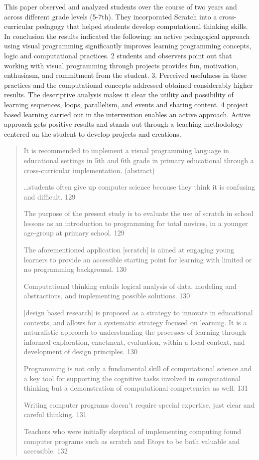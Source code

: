 \documentclass[12pt]{extarticle}
\begin{document}
This paper observed and analyzed students over the course of two years and across different grade levels (5-7th). They incorporated Scratch into a cross-curricular pedagogy that helped students develop computational thinking skills. In conclusion the results indicated the following: an active pedagogical approach using visual programming significantly improves learning programming concepts, logic and computational practices. 2 students and observers point out that working with visual programming through projects provides fun, motivation, enthusiasm, and commitment from the student. 3. Perceived usefulness in these practices and the computational concepts addressed obtained considerably higher results. The descriptive analysis makes it clear the utility and possibility of learning sequences, loops, parallelism, and events and sharing content. 4 project based learning carried out in the intervention enables an active approach. Active approach gets positive results and stands out through a teaching methodology centered on the student to develop projects and creations.
\begin{quotation}
    
    It is recommended to implement a visual programming language in educational settings in 5th and 6th grade in primary educational through a cross-curricular implementation. (abstract)
    
    …students often give up computer science because they think it is confusing and difficult. 	129
    
    The purpose of the present study is to evaluate the use of scratch in school lessons as an introduction to programming for total novices, in a younger age-group at primary school. 129
    
    The aforementioned application [scratch] is aimed at engaging young learners to provide an accessible starting point for learning with limited or no programming background. 	130
    
    Computational thinking entails logical analysis of data, modeling and abstractions, and implementing possible solutions. 	130
    
    [design based research] is proposed as a strategy to innovate in educational contexts, and allows for a systematic strategy focused on learning. It is a naturalistic approach to understanding the processes of learning through informed exploration, enactment, evaluation, within a local context, and development of design principles. 130
    
    Programming is not only a fundamental skill of computational science and a key tool for supporting the cognitive tasks involved in computational thinking but a demonstration of computational competencies as well.  131
    
    Writing computer programs doesn’t require special expertise, just clear and careful thinking. 131
    
    Teachers who were initially skeptical of implementing computing found computer programs such as scratch and Etoys to be both valuable and accessible. 132
\end{quotation}
\end{document}
